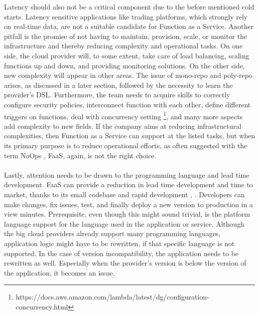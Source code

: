 \documentclass[11pt]{article}
\begin{document}
Latency should also not be a critical component due to the before mentioned cold starts. Latency sensitive applications like trading platforms, which strongly rely on real-time data, are not a suitable candidate for Function as a Service. Another pitfall is the promise of not having to maintain, provision, scale, or monitor the infrastructure and thereby reducing complexity and operational tasks. On one side, the cloud provider will, to some extent, take care of load balancing, scaling functions up and down, and providing monitoring solutions. On the other side, new complexity will appear in other areas. The issue of mono-repo and poly-repo arises, as discussed in a later section, followed by the necessity to learn the provider's DSL. Furthermore, the team needs to acquire skills to correctly configure security policies, interconnect function with each other, define different triggers on functions, deal with concurrency setting \footnote{https://docs.aws.amazon.com/lambda/latest/dg/configuration-concurrency.html}, and many more aspects add complexity to new fields. If the company aims at reducing infrastructural complexities, then Function as a Service can support at the listed tasks, but when its primary purpose is to reduce operational efforts, as often suggested with the term \glqq NoOps\grqq{} \cite{eivy2017wary}, FaaS, again, is not the right choice. \\\\
Lastly, attention needs to be drawn to the programming language and lead time development. FaaS can provide a reduction in lead time development and time to market, thanks to its small codebase and rapid development \cite{sewak2018winning}, \cite{leitner2019mixed}. Developers can make changes, fix issues, test, and finally deploy a new version to production in a view minutes. Prerequisite, even though this might sound trivial, is the platform language support for the language used in the application or service. Although the big cloud providers already support many programming languages, application logic might have to be rewritten, if that specific language is not supported. In the case of version incompatibility, the application needs to be rewritten as well. Especially when the provider's version is below the version of the application, it becomes an issue.
\end{document}
